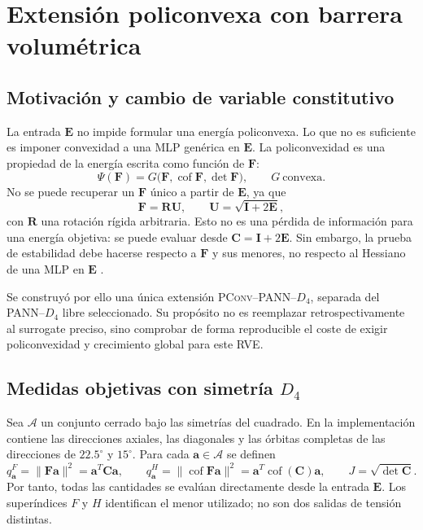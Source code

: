 \documentclass[11pt,a4paper]{article}
\newcommand{\E}{\ensuremath{\bm E}}
\newcommand{\F}{\ensuremath{\bm F}}
\newcommand{\Dfour}{\ensuremath{D_4}}
\newcommand{\PANN}{\textsc{PANN--}\Dfour}
\newcommand{\PConvPANN}{\textsc{PConv--PANN--}\Dfour}
\begin{document}
\section{Extensión policonvexa con barrera volumétrica}

\subsection{Motivación y cambio de variable constitutivo}

La entrada \(\E\) no impide formular una energía policonvexa. Lo que no es
suficiente es imponer convexidad a una MLP genérica en \(\E\). La
policonvexidad es una propiedad de la energía escrita como función de \(\F\):
\[
 \Psi(\F)=G\bigl(\F,\operatorname{cof}\F,\det\F\bigr),
 \qquad G\ \text{convexa}.
 \label{eq:polyconvex_definition}
\]
No se puede recuperar un \(\F\) único a partir de \(\E\), ya que
\[
 \F=\bm R\bm U,\qquad
 \bm U=\sqrt{\bm I+2\E},
\]
con \(\bm R\) una rotación rígida arbitraria. Esto no es una pérdida de
información para una energía objetiva: se puede evaluar desde
\(\bm C=\bm I+2\E\). Sin embargo, la prueba de estabilidad debe hacerse
respecto a \(\F\) y sus menores, no respecto al Hessiano de una MLP en
\(\E\) \cite{ball1977,linka2023}.

Se construyó por ello una única extensión \PConvPANN{}, separada del
\PANN{} libre seleccionado. Su propósito no es reemplazar retrospectivamente
al surrogate preciso, sino comprobar de forma reproducible el coste de exigir
policonvexidad y crecimiento global para este RVE.

\subsection{Medidas objetivas con simetría \texorpdfstring{\(\Dfour\)}{D4}}

Sea \(\mathcal A\) un conjunto cerrado bajo las simetrías del cuadrado. En
la implementación contiene las direcciones axiales, las diagonales y las
órbitas completas de las direcciones de \(22.5^\circ\) y \(15^\circ\).
Para cada \(\bm a\in\mathcal A\) se definen
\[
 q^{F}_{\bm a}=\lVert\F\bm a\rVert^2
 =\bm a^T\bm C\bm a,
 \qquad
 q^{H}_{\bm a}=\lVert\operatorname{cof}\F\bm a\rVert^2
 =\bm a^T\operatorname{cof}(\bm C)\bm a,
 \qquad J=\sqrt{\det\bm C}.
 \label{eq:directional_minors}
\]
Por tanto, todas las cantidades se evalúan directamente desde la entrada
\(\E\). Los superíndices \(F\) y \(H\) identifican el menor utilizado; no
son dos salidas de tensión distintas.
\end{document}
